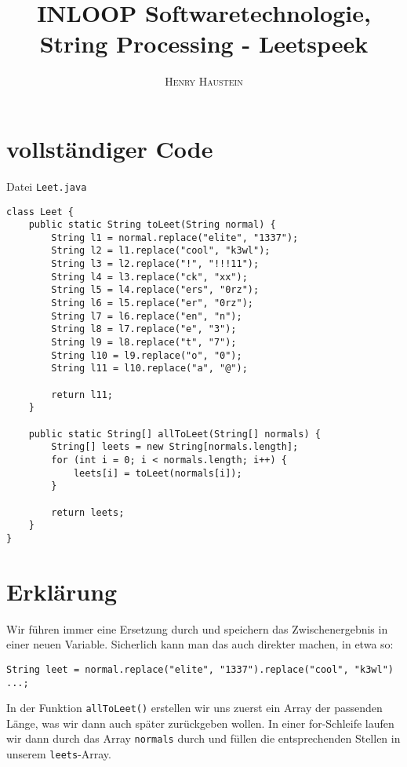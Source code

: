 \documentclass{article}
\title{\textbf{INLOOP Softwaretechnologie, String Processing - Leetspeek}}
\author{\textsc{Henry Haustein}}
\date{}
\begin{document}
	\maketitle
	
	\section*{vollständiger Code}
	Datei \texttt{Leet.java}
	\begin{lstlisting}[style=java,tabsize=2]
class Leet {
	public static String toLeet(String normal) {
		String l1 = normal.replace("elite", "1337");
		String l2 = l1.replace("cool", "k3wl");
		String l3 = l2.replace("!", "!!!11");
		String l4 = l3.replace("ck", "xx");
		String l5 = l4.replace("ers", "0rz");
		String l6 = l5.replace("er", "0rz");
		String l7 = l6.replace("en", "n");
		String l8 = l7.replace("e", "3");
		String l9 = l8.replace("t", "7");
		String l10 = l9.replace("o", "0");
		String l11 = l10.replace("a", "@");
		
		return l11;
	}
	
	public static String[] allToLeet(String[] normals) {
		String[] leets = new String[normals.length];
		for (int i = 0; i < normals.length; i++) {
			leets[i] = toLeet(normals[i]);
		}
		
		return leets;
	}
}
	\end{lstlisting}

	\section*{Erklärung}
	Wir führen immer eine Ersetzung durch und speichern das Zwischenergebnis in einer neuen Variable. Sicherlich kann man das auch direkter machen, in etwa so:
	\begin{lstlisting}[style=java]
String leet = normal.replace("elite", "1337").replace("cool", "k3wl") ...;
	\end{lstlisting}
	In der Funktion \texttt{allToLeet()} erstellen wir uns zuerst ein Array der passenden Länge, was wir dann auch später zurückgeben wollen. In einer for-Schleife laufen wir dann durch das Array \texttt{normals} durch und füllen die entsprechenden Stellen in unserem \texttt{leets}-Array.
	
	
\end{document}
